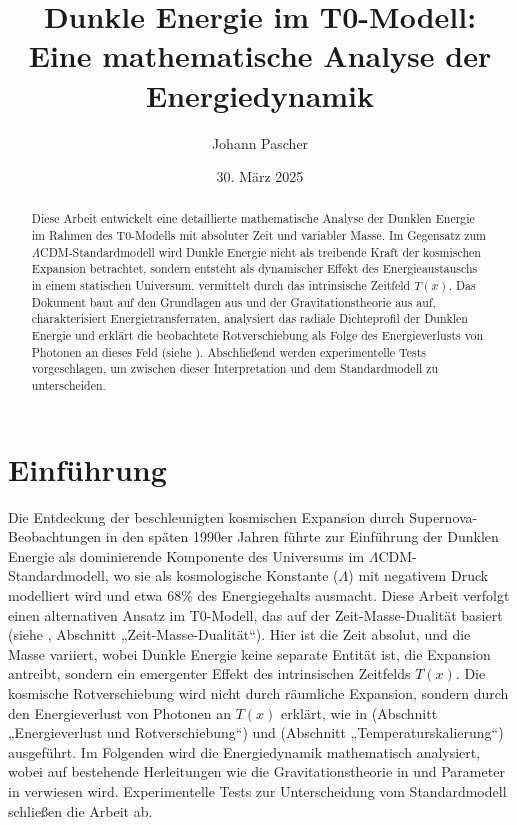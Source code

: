 \documentclass[a4paper,12pt]{article}
\theoremstyle{definition}
\theoremstyle{remark}
\newcommand{\Tfield}{T(x)} %
\begin{document}
	
	\title{Dunkle Energie im T0-Modell: \\Eine mathematische Analyse der Energiedynamik}
	\author{Johann Pascher}
	\date{30. März 2025}
	\maketitle
	
	\begin{abstract}
		Diese Arbeit entwickelt eine detaillierte mathematische Analyse der Dunklen Energie im Rahmen des T0-Modells mit absoluter Zeit und variabler Masse. Im Gegensatz zum \(\Lambda\)CDM-Standardmodell wird Dunkle Energie nicht als treibende Kraft der kosmischen Expansion betrachtet, sondern entsteht als dynamischer Effekt des Energieaustauschs in einem statischen Universum, vermittelt durch das intrinsische Zeitfeld \(\Tfield\). Das Dokument baut auf den Grundlagen aus \cite{pascher_params_2025} und der Gravitationstheorie aus \cite{pascher_galaxies_2025} auf, charakterisiert Energietransferraten, analysiert das radiale Dichteprofil der Dunklen Energie und erklärt die beobachtete Rotverschiebung als Folge des Energieverlusts von Photonen an dieses Feld (siehe \cite{pascher_messdifferenzen_2025}). Abschließend werden experimentelle Tests vorgeschlagen, um zwischen dieser Interpretation und dem Standardmodell zu unterscheiden.
	\end{abstract}
	
	\tableofcontents
	\newpage
	
	\section{Einführung}
	
	Die Entdeckung der beschleunigten kosmischen Expansion durch Supernova-Beobachtungen in den späten 1990er Jahren führte zur Einführung der Dunklen Energie als dominierende Komponente des Universums im \(\Lambda\)CDM-Standardmodell, wo sie als kosmologische Konstante (\(\Lambda\)) mit negativem Druck modelliert wird und etwa 68\% des Energiegehalts ausmacht. Diese Arbeit verfolgt einen alternativen Ansatz im T0-Modell, das auf der Zeit-Masse-Dualität basiert (siehe \cite{pascher_params_2025}, Abschnitt „Zeit-Masse-Dualität“). Hier ist die Zeit absolut, und die Masse variiert, wobei Dunkle Energie keine separate Entität ist, die Expansion antreibt, sondern ein emergenter Effekt des intrinsischen Zeitfelds \(\Tfield\). Die kosmische Rotverschiebung wird nicht durch räumliche Expansion, sondern durch den Energieverlust von Photonen an \(\Tfield\) erklärt, wie in \cite{pascher_messdifferenzen_2025} (Abschnitt „Energieverlust und Rotverschiebung“) und \cite{pascher_temp_2025} (Abschnitt „Temperaturskalierung“) ausgeführt. Im Folgenden wird die Energiedynamik mathematisch analysiert, wobei auf bestehende Herleitungen wie die Gravitationstheorie in \cite{pascher_galaxies_2025} und Parameter in \cite{pascher_params_2025} verwiesen wird. Experimentelle Tests zur Unterscheidung vom Standardmodell schließen die Arbeit ab.
	
\end{document}
